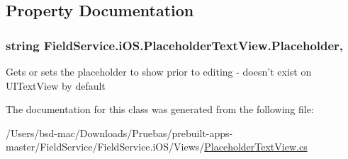 \subsection{Property Documentation}
\hypertarget{class_field_service_1_1i_o_s_1_1_placeholder_text_view_a1d0d8eaf2c61ef8fc99f4788c22a35d6}{
\subsubsection[{Placeholder}]{\setlength{\rightskip}{0pt plus 5cm}string Field\+Service.\+i\+O\+S.\+Placeholder\+Text\+View.\+Placeholder\hspace{0.3cm}{\ttfamily [get]}, {\ttfamily [set]}}}\label{class_field_service_1_1i_o_s_1_1_placeholder_text_view_a1d0d8eaf2c61ef8fc99f4788c22a35d6}


Gets or sets the placeholder to show prior to editing -\/ doesn't exist on U\+I\+Text\+View by default 



The documentation for this class was generated from the following file\+:\begin{DoxyCompactItemize}
\item 
/\+Users/bsd-\/mac/\+Downloads/\+Pruebas/prebuilt-\/apps-\/master/\+Field\+Service/\+Field\+Service.\+i\+O\+S/\+Views/\hyperlink{_placeholder_text_view_8cs}{Placeholder\+Text\+View.\+cs}\end{DoxyCompactItemize}
